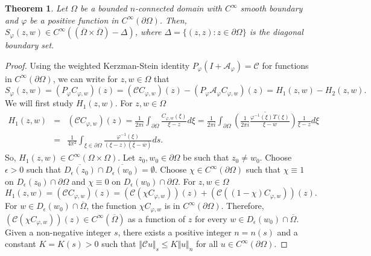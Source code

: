 \documentclass[11pt, reqno]{amsart}
\newtheorem{thm}{Theorem}[section]
\numberwithin{equation}{section}
\begin{document}
\begin{thm}\label{smooth}
Let $\Omega$ be a bounded $n$-connected domain with $C^{\infty}$ smooth boundary and $\varphi$ be a positive function in $C^{\infty}(\partial\Omega)$. Then, $S_{\varphi}(z,w)\in C^{\infty}((\overline{\Omega}\times\overline{\Omega})-\Delta)$, where $\Delta=\{(z,z):z\in\partial\Omega\}$ is the diagonal boundary set.
\end{thm}
\begin{proof}
Using the weighted Kerzman-Stein identity $P_{\varphi}(I+\mathcal{A}_{\varphi})=\mathcal{C}$ for functions in $C^{\infty}(\partial\Omega)$, we can write for $z,w\in\Omega$ that
\[
S_{\varphi}(z,w)
=
(P_{\varphi} C_{\varphi,w})(z)
=
(\mathcal{C} C_{\varphi,w})(z) - (P_{\varphi} \mathcal{A}_{\varphi} C_{\varphi,w})(z)
=
H_1(z,w)-H_2(z,w).
\]
We will first study $H_1(z,w)$. For $z,w\in\Omega$
\begin{eqnarray*}
H_1(z,w)
&=&
(\mathcal{C}C_{\varphi,w})(z)=\frac{1}{2\pi i}\int_{\partial\Omega} \frac{C_{\varphi,w}(\xi)}{\xi-z} d\xi=\frac{1}{2\pi i}\int_{\partial\Omega} \overline{\left(\frac{1}{2\pi i}\frac{\varphi^{-1}(\xi)T(\xi)}{\xi-w}\right)}\frac{1}{\xi-z} d\xi\\
&=&
\frac{1}{4\pi^2}\int_{\xi\in\partial\Omega}\frac{\varphi^{-1}(\xi)}{(\xi-z)(\overline{\xi}-\overline{w})} ds.
\end{eqnarray*}
So, $H_1(z,w)\in C^{\infty}(\Omega\times\Omega)$. Let $z_0, w_0\in\partial\Omega$ be such that $z_0\neq w_0$. Choose $\epsilon>0$ such that $\overline{D_{\epsilon}(z_0)}\cap \overline{D_{\epsilon}(w_0)}=\emptyset$. Choose $\chi\in C^{\infty}(\partial\Omega)$ such that $\chi\equiv 1$ on $D_{\epsilon}(z_0)\cap\partial\Omega$ and $\chi\equiv 0$ on $D_{\epsilon}(w_0)\cap\partial\Omega$. For $z,w\in\Omega$
\[
H_1(z,w)=(\mathcal{C} C_{\varphi,w})(z) 
=
(\mathcal{C}(\chi C_{\varphi,w}))(z)+(\mathcal{C}((1-\chi)C_{\varphi,w}))(z).
\]
For $w\in D_{\epsilon}(w_0)\cap\overline{\Omega}$, the function $\chi C_{\varphi,w}$ is in $C^{\infty}(\partial\Omega)$. Therefore, $(\mathcal{C}(\chi C_{\varphi,w}))(z)\in C^{\infty}(\overline{\Omega})$ as a function of $z$ for every $w\in D_{\epsilon}(w_0)\cap\overline{\Omega}$. Given a non-negative integer $s$, there exists a positive integer $n=n(s)$ and a constant $K=K(s)>0$ such that $\Vert \mathcal{C}u\Vert_{s}\leq K\Vert u\Vert_{n}$ for all $u\in C^{\infty}(\partial\Omega)$. 

\medskip


\end{proof}
\end{document}

